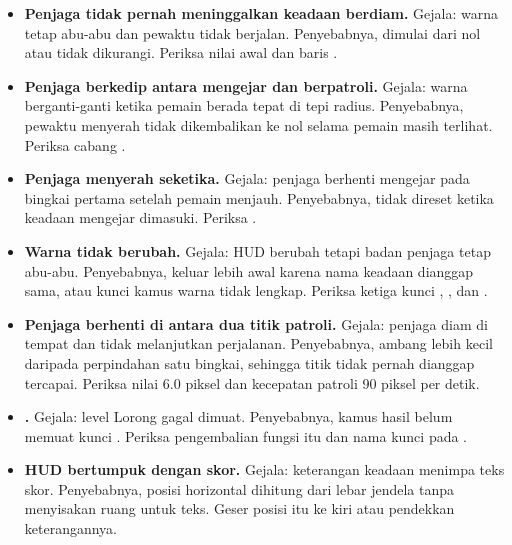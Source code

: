 \begin{galatbox}
\begin{itemize}[leftmargin=1.4em, itemsep=0.35em]
  \item \textbf{Penjaga tidak pernah meninggalkan keadaan berdiam.}
        Gejala: warna tetap abu-abu dan pewaktu tidak berjalan. Penyebabnya,
         dimulai dari nol atau tidak dikurangi. Periksa nilai
        awal  dan baris
        .
  \item \textbf{Penjaga berkedip antara mengejar dan berpatroli.}
        Gejala: warna berganti-ganti ketika pemain berada tepat di tepi radius.
        Penyebabnya, pewaktu menyerah tidak dikembalikan ke nol selama pemain
        masih terlihat. Periksa cabang .
  \item \textbf{Penjaga menyerah seketika.}
        Gejala: penjaga berhenti mengejar pada bingkai pertama setelah pemain
        menjauh. Penyebabnya,  tidak direset ketika keadaan
        mengejar dimasuki. Periksa .
  \item \textbf{Warna tidak berubah.}
        Gejala: HUD berubah tetapi badan penjaga tetap abu-abu. Penyebabnya,
         keluar lebih awal karena nama keadaan dianggap sama,
        atau kunci kamus warna tidak lengkap. Periksa ketiga kunci
        , , dan .
  \item \textbf{Penjaga berhenti di antara dua titik patroli.}
        Gejala: penjaga diam di tempat dan tidak melanjutkan perjalanan.
        Penyebabnya, ambang  lebih kecil daripada
        perpindahan satu bingkai, sehingga titik tidak pernah dianggap tercapai.
        Periksa nilai 6.0 piksel dan kecepatan patroli 90 piksel per detik.
  \item \textbf{.}
        Gejala: level Lorong gagal dimuat. Penyebabnya, kamus hasil
         belum memuat kunci . Periksa
        pengembalian fungsi itu dan nama kunci pada .
  \item \textbf{HUD bertumpuk dengan skor.}
        Gejala: keterangan keadaan menimpa teks skor. Penyebabnya, posisi
        horizontal dihitung dari lebar jendela tanpa menyisakan ruang untuk
        teks. Geser posisi itu ke kiri atau pendekkan keterangannya.
\end{itemize}
\end{galatbox}


